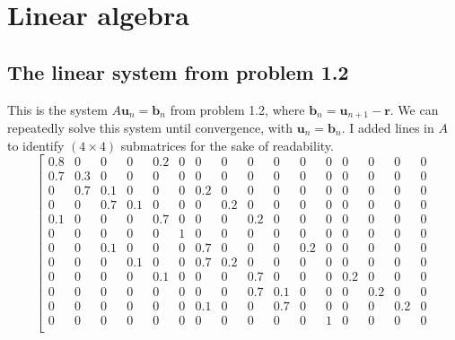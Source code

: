 \documentclass[letterpaper, 10pt]{article}
\begin{document}
\section{Linear algebra}
\subsection{The linear system from problem 1.2}
\label{ssec:matrix}
This is the system $A\mathbf{u}_n = \mathbf{b}_n$ from problem 1.2, where $\mathbf{b}_{n} = \mathbf{u}_{n+1} - \mathbf{r}$. We can repeatedly solve this system until convergence, with $\mathbf{u}_n = \mathbf{b}_{n}$. I added lines in $A$ to identify $(4 \times 4)$ submatrices for the sake of readability. 
\[
\left[
\begin{array}{cccc|cccc|cccc|cccc}
0.8 & 0    & 0   & 0   & 0.2 & 0   & 0   & 0   & 0   & 0   & 0   & 0   & 0   & 0   & 0   & 0   \\ %
0.7 & 0.3  & 0   & 0   & 0   & 0   & 0   & 0   & 0   & 0   & 0   & 0   & 0   & 0   & 0   & 0   \\ %
0   & 0.7  & 0.1 & 0   & 0   & 0   & 0.2 & 0   & 0   & 0   & 0   & 0   & 0   & 0   & 0   & 0   \\ %
0   & 0    & 0.7 & 0.1 & 0   & 0   & 0   & 0.2 & 0   & 0   & 0   & 0   & 0   & 0   & 0   & 0   \\ %
\hline
0.1 & 0    & 0   & 0   & 0.7 & 0   & 0   & 0   & 0.2 & 0   & 0   & 0   & 0   & 0   & 0   & 0   \\ %
0   & 0    & 0   & 0   & 0   & 1   & 0   & 0   & 0   & 0   & 0   & 0   & 0   & 0   & 0   & 0   \\ %
0   & 0    & 0.1 & 0   & 0   & 0   & 0.7 & 0   & 0   & 0   & 0.2 & 0   & 0   & 0   & 0   & 0   \\ %
0   & 0    & 0   & 0.1 & 0   & 0   & 0.7 & 0.2 & 0   & 0   & 0   & 0   & 0   & 0   & 0   & 0   \\ %
\hline
0   & 0    & 0   & 0   & 0.1 & 0   & 0   & 0   & 0.7 & 0   & 0   & 0   & 0.2 & 0   & 0   & 0   \\ %
0   & 0    & 0   & 0   & 0   & 0   & 0   & 0   & 0.7 & 0.1 & 0   & 0   & 0   & 0.2 & 0   & 0   \\ %
0   & 0    & 0   & 0   & 0   & 0   & 0.1 & 0   & 0   & 0.7 & 0   & 0   & 0   & 0   & 0.2 & 0   \\ %
0   & 0    & 0   & 0   & 0   & 0   & 0   & 0   & 0   & 0   & 0   & 1   & 0   & 0   & 0   & 0   \\ %

\end{array}\]
\end{document}
